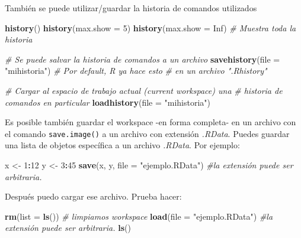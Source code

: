 \documentclass[]{article}
\newenvironment{Shaded}{\begin{snugshade}}{\end{snugshade}}
\newcommand{\KeywordTok}[1]{\textcolor[rgb]{0.13,0.29,0.53}{\textbf{#1}}}
\newcommand{\DataTypeTok}[1]{\textcolor[rgb]{0.13,0.29,0.53}{#1}}
\newcommand{\DecValTok}[1]{\textcolor[rgb]{0.00,0.00,0.81}{#1}}
\newcommand{\StringTok}[1]{\textcolor[rgb]{0.31,0.60,0.02}{#1}}
\newcommand{\CommentTok}[1]{\textcolor[rgb]{0.56,0.35,0.01}{\textit{#1}}}
\newcommand{\OtherTok}[1]{\textcolor[rgb]{0.56,0.35,0.01}{#1}}
\newcommand{\OperatorTok}[1]{\textcolor[rgb]{0.81,0.36,0.00}{\textbf{#1}}}
\newcommand{\NormalTok}[1]{#1}
\begin{document}
También se puede utilizar/guardar la historia de comandos utilizados

\begin{Shaded}
\begin{Highlighting}[]
\KeywordTok{history}\NormalTok{()}
\KeywordTok{history}\NormalTok{(}\DataTypeTok{max.show =} \DecValTok{5}\NormalTok{)}
\KeywordTok{history}\NormalTok{(}\DataTypeTok{max.show =} \OtherTok{Inf}\NormalTok{) }\CommentTok{# Muestra toda la historia}

\CommentTok{# Se puede salvar la historia de comandos a un archivo}
\KeywordTok{savehistory}\NormalTok{(}\DataTypeTok{file =} \StringTok{"mihistoria"}\NormalTok{) }\CommentTok{# Por default, R ya hace esto }
\CommentTok{# en un archivo ".Rhistory"}

\CommentTok{# Cargar al espacio de trabajo actual (current workspace) una }
\CommentTok{# historia de comandos en particular}
\KeywordTok{loadhistory}\NormalTok{(}\DataTypeTok{file =} \StringTok{"mihistoria"}\NormalTok{)}
\end{Highlighting}
\end{Shaded}

Es posible también guardar el workspace -en forma completa- en un
archivo con el comando \texttt{save.image()} a un archivo con extensión
\emph{.RData}. Puedes guardar una lista de objetos específica a un
archivo \emph{.RData}. Por ejemplo:

\begin{Shaded}
\begin{Highlighting}[]
\NormalTok{x <-}\StringTok{ }\DecValTok{1}\OperatorTok{:}\DecValTok{12}
\NormalTok{y <-}\StringTok{ }\DecValTok{3}\OperatorTok{:}\DecValTok{45}
\KeywordTok{save}\NormalTok{(x, y, }\DataTypeTok{file =} \StringTok{"ejemplo.RData"}\NormalTok{) }\CommentTok{#la extensión puede ser arbitraria.}
\end{Highlighting}
\end{Shaded}

Después puedo cargar ese archivo. Prueba hacer:

\begin{Shaded}
\begin{Highlighting}[]
\KeywordTok{rm}\NormalTok{(}\DataTypeTok{list =} \KeywordTok{ls}\NormalTok{()) }\CommentTok{# limpiamos workspace}
\KeywordTok{load}\NormalTok{(}\DataTypeTok{file =} \StringTok{"ejemplo.RData"}\NormalTok{) }\CommentTok{#la extensión puede ser arbitraria.}
\KeywordTok{ls}\NormalTok{()}
\end{Highlighting}
\end{Shaded}
\end{document}
